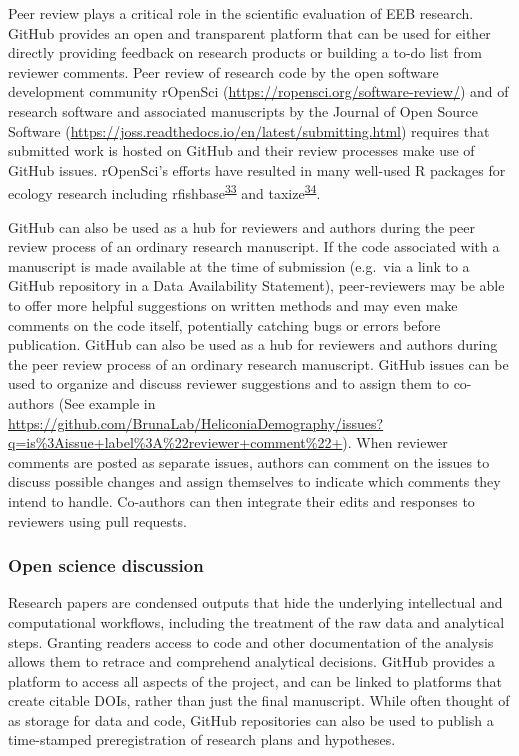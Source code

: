 Peer review plays a critical role in the scientific evaluation of EEB research.
GitHub provides an open and transparent platform that can be used for either directly providing feedback on research products or building a to-do list from reviewer comments.
Peer review of research code by the open software development community rOpenSci (\url{https://ropensci.org/software-review/}) and of research software and associated manuscripts by the Journal of Open Source Software (\url{https://joss.readthedocs.io/en/latest/submitting.html}) requires that submitted work is hosted on GitHub and their review processes make use of GitHub issues.
rOpenSci's efforts have resulted in many well-used R packages for ecology research including rfishbase\textsuperscript{\protect\hyperlink{ref-Xsdcv6q}{33}} and taxize\textsuperscript{\protect\hyperlink{ref-FVBWKkZu}{34}}.

GitHub can also be used as a hub for reviewers and authors during the peer review process of an ordinary research manuscript.
If the code associated with a manuscript is made available at the time of submission (e.g.~via a link to a GitHub repository in a Data Availability Statement), peer-reviewers may be able to offer more helpful suggestions on written methods and may even make comments on the code itself, potentially catching bugs or errors before publication.
GitHub can also be used as a hub for reviewers and authors during the peer review process of an ordinary research manuscript.
GitHub issues can be used to organize and discuss reviewer suggestions and to assign them to co-authors (See example in \url{https://github.com/BrunaLab/HeliconiaDemography/issues?q=is\%3Aissue+label\%3A\%22reviewer+comment\%22+}).
When reviewer comments are posted as separate issues, authors can comment on the issues to discuss possible changes and assign themselves to indicate which comments they intend to handle.
Co-authors can then integrate their edits and responses to reviewers using pull requests.

\hypertarget{open-science-discussion}{%
\subsubsection{Open science discussion}\label{open-science-discussion}}

Research papers are condensed outputs that hide the underlying intellectual and computational workflows, including the treatment of the raw data and analytical steps.
Granting readers access to code and other documentation of the analysis allows them to retrace and comprehend analytical decisions.
GitHub provides a platform to access all aspects of the project, and can be linked to platforms that create citable DOIs, rather than just the final manuscript.
While often thought of as storage for data and code, GitHub repositories can also be used to publish a time-stamped preregistration of research plans and hypotheses.

